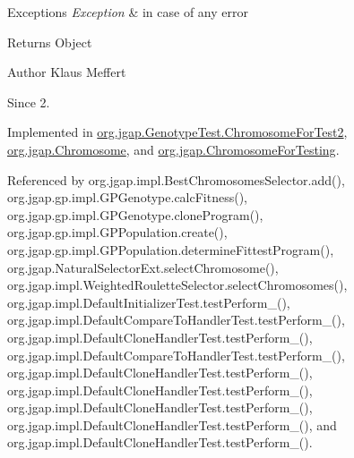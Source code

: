 \begin{DoxyExceptions}{Exceptions}
{\em Exception} & in case of any error \\
\hline
\end{DoxyExceptions}
\begin{DoxyReturn}{Returns}
Object
\end{DoxyReturn}
\begin{DoxyAuthor}{Author}
Klaus Meffert 
\end{DoxyAuthor}
\begin{DoxySince}{Since}
2. 
\end{DoxySince}


Implemented in \hyperlink{classorg_1_1jgap_1_1_genotype_test_1_1_chromosome_for_test2_a1bdbbfe0c132aa8096c909a7bfd7f7b8}{org.\-jgap.\-Genotype\-Test.\-Chromosome\-For\-Test2}, \hyperlink{classorg_1_1jgap_1_1_chromosome_abee38007a07ba7a1442dd96571ed7cc1}{org.\-jgap.\-Chromosome}, and \hyperlink{classorg_1_1jgap_1_1_chromosome_for_testing_a89f5971800a63faa175bed4d141aa932}{org.\-jgap.\-Chromosome\-For\-Testing}.



Referenced by org.\-jgap.\-impl.\-Best\-Chromosomes\-Selector.\-add(), org.\-jgap.\-gp.\-impl.\-G\-P\-Genotype.\-calc\-Fitness(), org.\-jgap.\-gp.\-impl.\-G\-P\-Genotype.\-clone\-Program(), org.\-jgap.\-gp.\-impl.\-G\-P\-Population.\-create(), org.\-jgap.\-gp.\-impl.\-G\-P\-Population.\-determine\-Fittest\-Program(), org.\-jgap.\-Natural\-Selector\-Ext.\-select\-Chromosome(), org.\-jgap.\-impl.\-Weighted\-Roulette\-Selector.\-select\-Chromosomes(), org.\-jgap.\-impl.\-Default\-Initializer\-Test.\-test\-Perform\-\_(), org.\-jgap.\-impl.\-Default\-Compare\-To\-Handler\-Test.\-test\-Perform\-\_(), org.\-jgap.\-impl.\-Default\-Clone\-Handler\-Test.\-test\-Perform\-\_(), org.\-jgap.\-impl.\-Default\-Compare\-To\-Handler\-Test.\-test\-Perform\-\_(), org.\-jgap.\-impl.\-Default\-Clone\-Handler\-Test.\-test\-Perform\-\_(), org.\-jgap.\-impl.\-Default\-Clone\-Handler\-Test.\-test\-Perform\-\_(), org.\-jgap.\-impl.\-Default\-Clone\-Handler\-Test.\-test\-Perform\-\_(), org.\-jgap.\-impl.\-Default\-Clone\-Handler\-Test.\-test\-Perform\-\_(), and org.\-jgap.\-impl.\-Default\-Clone\-Handler\-Test.\-test\-Perform\-\_().



